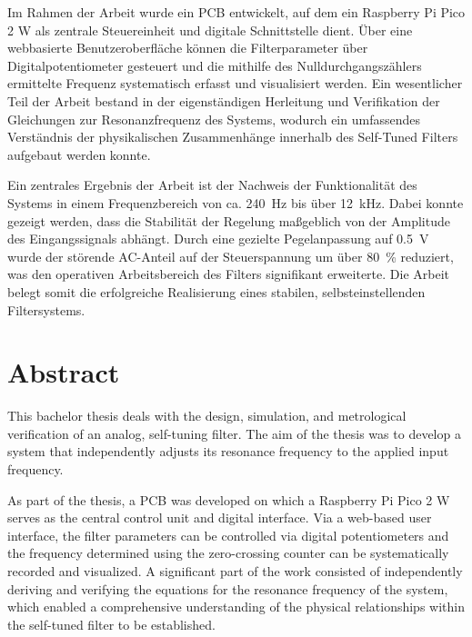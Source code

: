 \documentclass[a4paper,11pt]{book}
\begin{document}
Im Rahmen der Arbeit wurde ein PCB entwickelt, auf dem ein Raspberry Pi Pico 2 W als zentrale Steuereinheit und digitale Schnittstelle dient. Über eine webbasierte Benutzeroberfläche können die Filterparameter über Digitalpotentiometer gesteuert und die mithilfe des Nulldurchgangszählers ermittelte Frequenz systematisch erfasst und visualisiert werden. Ein wesentlicher Teil der Arbeit bestand in der eigenständigen Herleitung und Verifikation der Gleichungen zur Resonanzfrequenz des Systems, wodurch ein umfassendes Verständnis der physikalischen Zusammenhänge innerhalb des Self-Tuned Filters aufgebaut werden konnte.\par
\medskip

Ein zentrales Ergebnis der Arbeit ist der Nachweis der Funktionalität des Systems in einem Frequenzbereich von ca. \SI{240}{\hertz} bis über \SI{12}{\kilo\hertz}. Dabei konnte gezeigt werden, dass die Stabilität der Regelung maßgeblich von der Amplitude des Eingangssignals abhängt. Durch eine gezielte Pegelanpassung auf \SI{0.5}{\volt} wurde der störende AC-Anteil auf der Steuerspannung um über \SI{80}{\percent} reduziert, was den operativen Arbeitsbereich des Filters signifikant erweiterte. Die Arbeit belegt somit die erfolgreiche Realisierung eines stabilen, selbsteinstellenden Filtersystems.\par
\medskip

\section*{Abstract}
This bachelor thesis deals with the design, simulation, and metrological verification of an analog, self-tuning filter. The aim of the thesis was to develop a system that independently adjusts its resonance frequency to the applied input frequency. \par
\medskip

As part of the thesis, a PCB was developed on which a Raspberry Pi Pico 2 W serves as the central control unit and digital interface. Via a web-based user interface, the filter parameters can be controlled via digital potentiometers and the frequency determined using the zero-crossing counter can be systematically recorded and visualized. A significant part of the work consisted of independently deriving and verifying the equations for the resonance frequency of the system, which enabled a comprehensive understanding of the physical relationships within the self-tuned filter to be established.\par
\medskip
\end{document}
